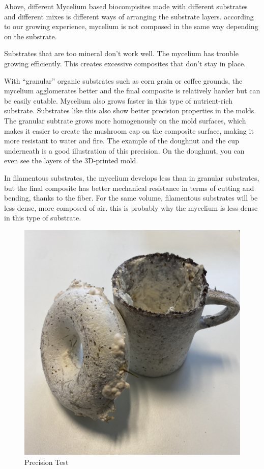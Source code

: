 Above, different Mycelium based biocompisites made with different substrates and different mixes is different ways of arranging the substrate layers. 
according to our growing experience, mycelium is not composed in the same way depending on the substrate. 

Substrates that are too mineral don't work well. The mycelium has trouble growing efficiently. This creates excessive composites that don't stay in place. 

With “granular” organic substrates such as corn grain or coffee grounds, the mycelium agglomerates better and the final composite is relatively harder but can be easily cutable. Mycelium also grows faster in this type of nutrient-rich substrate. 
Substrates like this also show better precision properties in the molds. The granular subtrate grows more homogenously on the mold surfaces, which makes it easier to create the mushroom cap on the composite surface, making it more resistant to water and fire. The example of the doughnut and the cup underneath is a good illustration of this precision. On the doughnut, you can even see the layers of the 3D-printed mold. 

In filamentous substrates, the mycelium develops less than in granular substrates, but the final composite has better mechanical resistance in terms of cutting and bending, thanks to the fiber. 
For the same volume, filamentous substrates will be less dense, more composed of air. this is probably why the mycelium is less dense in this type of substrate.

\begin{figure}[h]
    \centering
    \includegraphics{images/IMG_1838.JPG}
    \caption{Precision Test}
    \label{fig:donutandcup}
\end{figure} 

